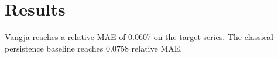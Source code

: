 \documentclass{article}
\begin{document}
\section{Results}
Vangja reaches a relative MAE of 0.0607 on the target series.
The classical persistence baseline reaches 0.0758 relative MAE.
\end{document}
